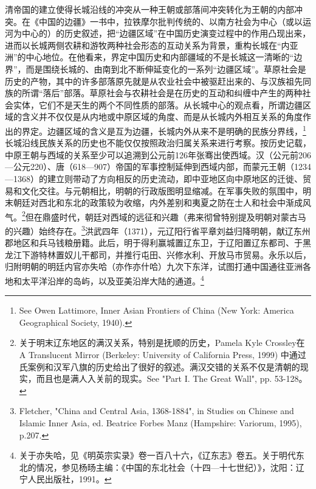 \documentclass[a4paper, 12pt, openright]{ctexbook}
\begin{document}
清帝国的建立使得长城沿线的冲突从一种王朝或部落间冲突转化为王朝的内部冲突。在《中国的边疆》一书中，拉铁摩尔批判传统的、以南方社会为中心（或以运河为中心的）的历史叙述，把“边疆区域”在中国历史演变过程中的作用凸现出来，进而以长城两侧农耕和游牧两种社会形态的互动关系为背景，重构长城在“内亚洲”的中心地位。在他看来，界定中国历史和内部疆域的不是长城这一清晰的“边界”，而是围绕长城的、由南到北不断伸延变化的一系列“边疆区域”。草原社会是历史的产物，其中的许多部落原先就是从农业社会中被驱赶出来的、与汉族祖先同族的所谓“落后”部落。草原社会与农耕社会是在历史的互动和纠缠中产生的两种社会实体，它们不是天生的两个不同性质的部落。从长城中心的观点看，所谓边疆区域的含义并不仅仅是从内地或中原区域的角度、而是从长城内外相互关系的角度作出的界定。边疆区域的含义是互为边疆，长城内外从来不是明确的民族分界线，\footnote{See Owen Lattimore, Inner Asian Frontiers of China (New York: America Geographical Society, 1940).}长城沿线民族关系的历史也不能仅仅按照政治归属关系来进行考察。按历史记载，中原王朝与西域的关系至少可以追溯到公元前126年张骞出使西域。汉（公元前206—公元220）、唐（618—907）帝国的军事控制延伸到西域内部，而蒙元王朝（1234—1368）的建立则带动了方向相反的历史流动，即中亚地区向中原地区的迁徙、贸易和文化交往。与元朝相比，明朝的行政版图明显缩减。在军事失败的氛围中，明末朝廷对西北和东北的政策较为收缩，内外差别和夷夏之防在士人和社会中渐成风气。\footnote{关于明末辽东地区的满汉关系，特别是抚顺的历史，Pamela Kyle Crossley在 A Translucent Mirror (Berkeley: University of California Press, 1999) 中通过氏案例和汉军八旗的历史给出了很好的叙述。满汉交错的关系不仅是清朝的现实，而且也是满人入关前的现实。See "Part I. The Great Wall", pp. 53-128。}但在鼎盛时代，朝廷对西域的远征和兴趣（弗来彻曾特别提及明朝对蒙古马的兴趣）始终存在。\footnote{Fletcher, "China and Central Asia, 1368-1884", in Studies on Chinese and Islamic Inner Asia, ed. Beatrice Forbes Manz (Hampshire: Variorum, 1995), p.207.}洪武四年（1371），元辽阳行省平章刘益归降明朝，献辽东州郡地区和兵马钱粮册籍。此后，明于得利赢城置辽东卫，于辽阳置辽东都司、于黑龙江下游特林置奴儿干都司，并推行屯田、兴修水利、开放马市贸易。永乐以后，归附明朝的明廷内官亦失哈（亦作亦什哈）九次下东洋，试图打通中国通往亚洲各地和太平洋沿岸的岛屿，以及亚美沿岸大陆的通道。\footnote{关于亦失哈，见《明英宗实录》卷一百八十六，《辽东志》卷五。关于明代东北的情况，参见杨旸主编：《中国的东北社会（十四—十七世纪）》，沈阳：辽宁人民出版社，1991。}
\end{document}
